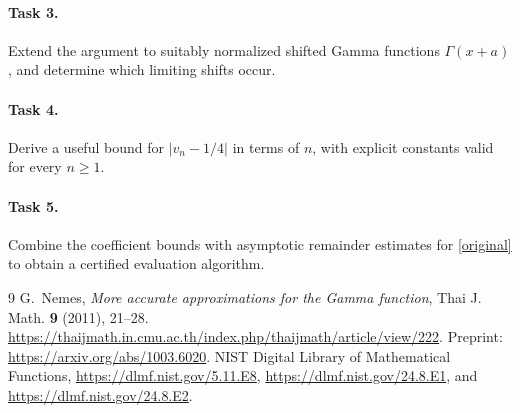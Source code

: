\documentclass[11pt]{article}
\begin{document}
\paragraph{Task 3.}
Extend the argument to suitably normalized shifted Gamma functions
\(\Gamma(x+a)\), and determine which limiting shifts occur.

\paragraph{Task 4.}
Derive a useful bound for \(|v_n-1/4|\) in terms of \(n\), with explicit
constants valid for every \(n\ge1\).

\paragraph{Task 5.}
Combine the coefficient bounds with asymptotic remainder estimates
for \eqref{original} to obtain a certified evaluation algorithm.

\begin{thebibliography}{9}
G.~Nemes, \emph{More accurate approximations for the Gamma function},
Thai J. Math. \textbf{9} (2011), 21--28.
\url{https://thaijmath.in.cmu.ac.th/index.php/thaijmath/article/view/222}.
Preprint: \url{https://arxiv.org/abs/1003.6020}.
NIST Digital Library of Mathematical Functions,
\url{https://dlmf.nist.gov/5.11.E8},
\url{https://dlmf.nist.gov/24.8.E1}, and
\url{https://dlmf.nist.gov/24.8.E2}.
\end{thebibliography}
\end{document}
